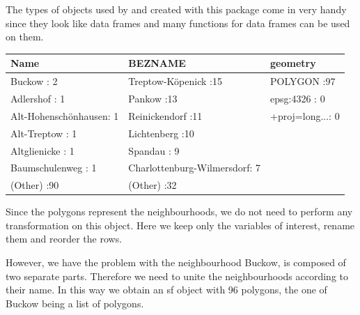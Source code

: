 The types of objects used by and created with this package come in very handy since they look like data frames and many functions for data frames can be used on them. 

\begin{table}[H]
\centering
\begin{tabular}{lll}
  \hline \hline
                  Name &                       BEZNAME &          geometry \\ 
  \hline
Buckow              : 2   & Treptow-Köpenick          :15   & POLYGON      :97   \\ 
  Adlershof           : 1   & Pankow                    :13   & epsg:4326    : 0   \\ 
  Alt-Hohenschönhausen: 1   & Reinickendorf             :11   & +proj=long...: 0   \\ 
  Alt-Treptow         : 1   & Lichtenberg               :10   &  \\ 
  Altglienicke        : 1   & Spandau                   : 9   &  \\ 
  Baumschulenweg      : 1   & Charlottenburg-Wilmersdorf: 7   &  \\ 
  (Other)             :90   & (Other)                   :32   &  \\ 
   \hline \hline
\end{tabular}
\end{table}

Since the polygons represent the neighbourhoods, we do not need to perform any transformation on this object. Here we keep only the variables of interest, rename them and reorder the rows.



However, we have the problem with the neighbourhood Buckow, is composed of two separate
parts. Therefore we need to unite the neighbourhoods according to their name. In this way we obtain an sf object with 96 polygons, the one of Buckow being a list of polygons.



